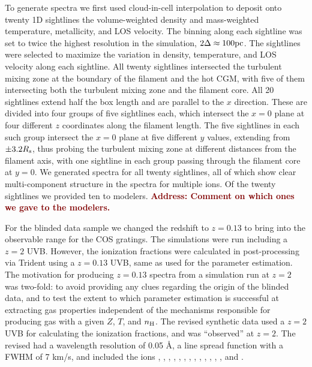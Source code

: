 \documentclass[fleqn,usenatbib]{mnras}
\newcommand{\todo}[1]{\textcolor{Maroon}{\textbf{Address: #1}}}
\begin{document}
To generate spectra we first used cloud-in-cell interpolation to deposit onto twenty 1D sightlines the volume-weighted density and mass-weighted temperature, metallicity, and LOS velocity.
The binning along each sightline was set to twice the highest resolution in the simulation, $2\Delta \approx 100{\rm pc}$.
The sightlines were selected to maximize the variation in density, temperature, and LOS velocity along each sightline.
All twenty sightlines intersected the turbulent mixing zone at the boundary of the filament and the hot CGM, with five of them intersecting both the turbulent mixing zone and the filament core.
All 20 sightlines extend half the box length and are parallel to the $x$ direction.
These are divided into four groups of five sightlines each, which intersect the $x=0$ plane at four different $z$ coordinates along the filament length.
The five sightlines in each such group intersect the $x=0$ plane at five different $y$ values, extending from $\pm 3.2R_{\rm s}$, thus probing the turbulent mixing zone at different distances from the filament axis, with one sightline in each group passing through the filament core at $y=0$.
We generated spectra for all twenty sightlines, all of which show clear multi-component structure in the spectra for multiple ions.
Of the twenty sightlines we provided ten to modelers.
\todo{Comment on which ones we gave to the modelers.}

For the blinded data sample we changed the redshift to $z=0.13$ to bring  into the observable range for the COS gratings.
The simulations were run including a $z=2$ UVB.
However, the ionization fractions were calculated in post-processing via Trident using a $z=0.13$ \cite{Haardt2012} UVB, same as used for the parameter estimation.
The motivation for producing $z=0.13$ spectra from a simulation run at $z=2$ was two-fold:
to avoid providing any clues regarding the origin of the blinded data,
and to test the extent to which parameter estimation is successful at extracting gas properties independent of the mechanisms responsible for producing gas with a given $Z$, $T$, and $n_{\rm H}$.
The revised synthetic data used a $z=2$ UVB for calculating the ionization fractions, and was ``observed'' at $z=2$.
The revised had a wavelength resolution of 0.05 \AA,
a line spread function with a FWHM of 7 km/s,
and included the ions , , , , , , , , , , , , , and .
\end{document}
